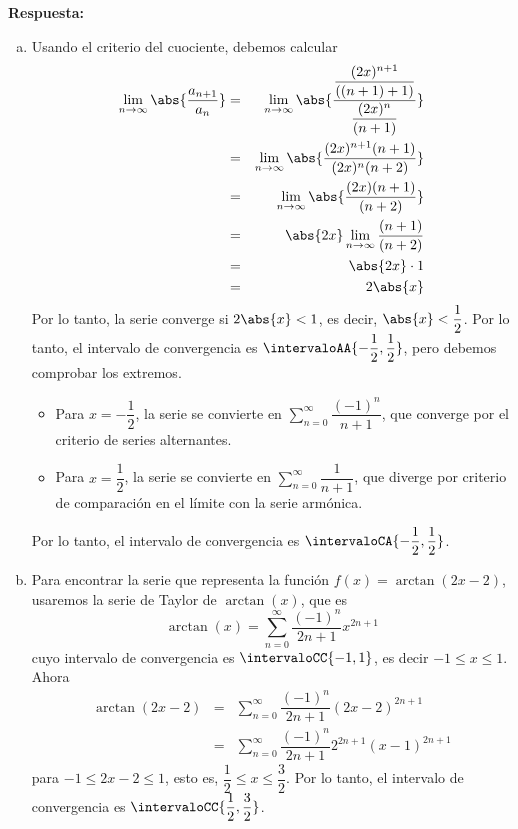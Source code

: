 \documentclass{article}
\begin{document}
\vspace{0.25cm}
\noindent\textbf{Respuesta:} 
\begin{enumerate}[a)]
  \item Usando el criterio del cuociente, debemos calcular
    \begin{eqnarray*}
      \lim_{n\to\infty}\abs{\dfrac{a_{n+1}}{a_n}}
        &=& \lim_{n\to\infty}\abs{\dfrac{\dfrac{(2x)^{n+1}}{((n+1)+1)}}{\dfrac{(2x)^n}{(n+1)}}}\\
        &=& \lim_{n\to\infty}\abs{\dfrac{(2x)^{n+1}(n+1)}{(2x)^n(n+2)}}\\
        &=& \lim_{n\to\infty}\abs{\dfrac{(2x)(n+1)}{(n+2)}}\\
        &=& \abs{2x}\lim_{n\to\infty}\dfrac{(n+1)}{(n+2)}\\
        &=& \abs{2x}\cdot 1\\
        &=& 2\abs{x}
    \end{eqnarray*}
    Por lo tanto, la serie converge si $2\abs{x}<1$, es decir, $\abs{x}<\dfrac{1}{2}$. Por lo tanto, el intervalo de convergencia es $\intervaloAA{-\dfrac{1}{2},\dfrac{1}{2}}$, pero debemos comprobar los extremos.
    \begin{itemize}
      \item Para $x=-\dfrac{1}{2}$, la serie se convierte en $\sum_{n=0}^{\infty}\dfrac{(-1)^n}{n+1}$, que converge por el criterio de series alternantes.
      \item Para $x=\dfrac{1}{2}$, la serie se convierte en $\sum_{n=0}^{\infty}\dfrac{1}{n+1}$, que diverge por criterio de comparación en el límite con la serie armónica.
    \end{itemize}
    Por lo tanto, el intervalo de convergencia es $\intervaloCA{-\dfrac{1}{2},\dfrac{1}{2}}$.
  \newpage
  \item Para encontrar la serie que representa la función $f(x)=\arctan(2x-2)$, usaremos la serie de Taylor de $\arctan(x)$, que es
    $$\arctan(x)=\sum_{n=0}^{\infty}\dfrac{(-1)^n}{2n+1}x^{2n+1}$$
    cuyo intervalo de convergencia es $\intervaloCC{-1,1}$, es decir $-1\leq x\leq 1$. Ahora
    \begin{eqnarray*}
      \arctan(2x-2)
        &=& \sum_{n=0}^{\infty}\dfrac{(-1)^n}{2n+1}(2x-2)^{2n+1}\\
        &=& \sum_{n=0}^{\infty}\dfrac{(-1)^n}{2n+1}2^{2n+1}(x-1)^{2n+1}
    \end{eqnarray*}
    para $-1\leq 2x-2\leq 1$, esto es, $\dfrac{1}{2}\leq x\leq \dfrac{3}{2}$. Por lo tanto, el intervalo de convergencia es $\intervaloCC{\dfrac{1}{2},\dfrac{3}{2}}$.

\end{enumerate}
\end{document}
